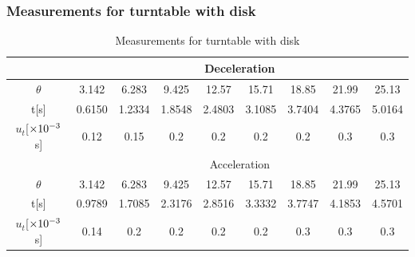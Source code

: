 \subsubsection{Measurements for turntable with disk}
    \begin{table}[H] \small
        \centering
        \begin{tabular}{|c|c|c|c|c|c|c|c|c|}
            \hline
            & \multicolumn{8}{c|}{Deceleration} \\\hline
            $\theta$ & 3.142 & 6.283 & 9.425 & 12.57 & 15.71 & 18.85 & 21.99 & 25.13\\\hline
            t[s] & 0.6150 & 1.2334 & 1.8548 & 2.4803 & 3.1085 & 3.7404 & 4.3765 & 5.0164\\\hline
            $u_t$[$\times10^{-3}$s] & 0.12 & 0.15 & 0.2 & 0.2 & 0.2 & 0.2 & 0.3 & 0.3\\\hline
            & \multicolumn{8}{c|}{Acceleration} \\\hline
            $\theta$ & 3.142 & 6.283 & 9.425 & 12.57 & 15.71 & 18.85 & 21.99 & 25.13\\\hline
            t[s] & 0.9789 & 1.7085 & 2.3176 & 2.8516 & 3.3332 & 3.7747 & 4.1853 & 4.5701\\\hline
            $u_t$[$\times10^{-3}$s] & 0.14 & 0.2 & 0.2 & 0.2 & 0.2 & 0.3 & 0.3 & 0.3\\\hline
        \end{tabular}
        \caption{Measurements for turntable with disk}\label{data_2}
    \end{table}

